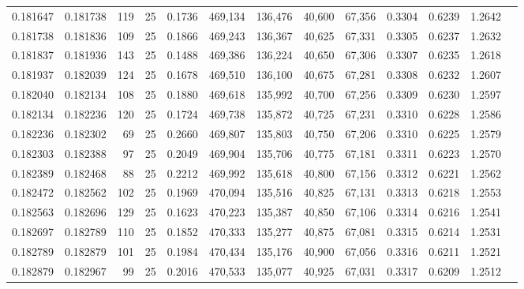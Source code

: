 \begin{tabular}{rrrrrrrrrrrrr}
0.181647 & 0.181738 &   119 &  25 &                                     0.1736 & 469,134 & 136,476 &  40,600 &  67,356 & 0.3304 & 0.6239 & 1.2642 \\
0.181738 & 0.181836 &   109 &  25 &                                     0.1866 & 469,243 & 136,367 &  40,625 &  67,331 & 0.3305 & 0.6237 & 1.2632 \\
0.181837 & 0.181936 &   143 &  25 &                                     0.1488 & 469,386 & 136,224 &  40,650 &  67,306 & 0.3307 & 0.6235 & 1.2618 \\
0.181937 & 0.182039 &   124 &  25 &                                     0.1678 & 469,510 & 136,100 &  40,675 &  67,281 & 0.3308 & 0.6232 & 1.2607 \\
0.182040 & 0.182134 &   108 &  25 &                                     0.1880 & 469,618 & 135,992 &  40,700 &  67,256 & 0.3309 & 0.6230 & 1.2597 \\
0.182134 & 0.182236 &   120 &  25 &                                     0.1724 & 469,738 & 135,872 &  40,725 &  67,231 & 0.3310 & 0.6228 & 1.2586 \\
0.182236 & 0.182302 &    69 &  25 &                                     0.2660 & 469,807 & 135,803 &  40,750 &  67,206 & 0.3310 & 0.6225 & 1.2579 \\
0.182303 & 0.182388 &    97 &  25 &                                     0.2049 & 469,904 & 135,706 &  40,775 &  67,181 & 0.3311 & 0.6223 & 1.2570 \\
0.182389 & 0.182468 &    88 &  25 &                                     0.2212 & 469,992 & 135,618 &  40,800 &  67,156 & 0.3312 & 0.6221 & 1.2562 \\
0.182472 & 0.182562 &   102 &  25 &                                     0.1969 & 470,094 & 135,516 &  40,825 &  67,131 & 0.3313 & 0.6218 & 1.2553 \\
0.182563 & 0.182696 &   129 &  25 &                                     0.1623 & 470,223 & 135,387 &  40,850 &  67,106 & 0.3314 & 0.6216 & 1.2541 \\
0.182697 & 0.182789 &   110 &  25 &                                     0.1852 & 470,333 & 135,277 &  40,875 &  67,081 & 0.3315 & 0.6214 & 1.2531 \\
0.182789 & 0.182879 &   101 &  25 &                                     0.1984 & 470,434 & 135,176 &  40,900 &  67,056 & 0.3316 & 0.6211 & 1.2521 \\
0.182879 & 0.182967 &    99 &  25 &                                     0.2016 & 470,533 & 135,077 &  40,925 &  67,031 & 0.3317 & 0.6209 & 1.2512 \\

\end{tabular}
